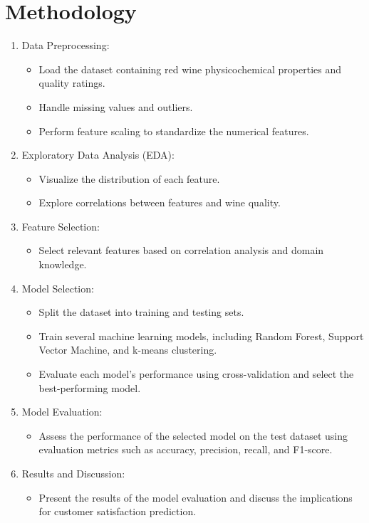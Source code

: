 \documentclass{article}
\begin{document}
\section{Methodology}
\begin{enumerate}
    \item Data Preprocessing:
    \begin{itemize}
        \item Load the dataset containing red wine physicochemical properties and quality ratings.
        \item Handle missing values and outliers.
        \item Perform feature scaling to standardize the numerical features.
    \end{itemize}
    
    \item Exploratory Data Analysis (EDA):
    \begin{itemize}
        \item Visualize the distribution of each feature.
        \item Explore correlations between features and wine quality.
    \end{itemize}
    
    \item Feature Selection:
    \begin{itemize}
        \item Select relevant features based on correlation analysis and domain knowledge.
    \end{itemize}
    
    \item Model Selection:
    \begin{itemize}
        \item Split the dataset into training and testing sets.
        \item Train several machine learning models, including Random Forest, Support Vector Machine, and k-means clustering.
        \item Evaluate each model's performance using cross-validation and select the best-performing model.
    \end{itemize}
    
    \item Model Evaluation:
    \begin{itemize}
        \item Assess the performance of the selected model on the test dataset using evaluation metrics such as accuracy, precision, recall, and F1-score.
    \end{itemize}
    
    \item Results and Discussion:
    \begin{itemize}
        \item Present the results of the model evaluation and discuss the implications for customer satisfaction prediction.
    \end{itemize}

\end{enumerate}
\end{document}
